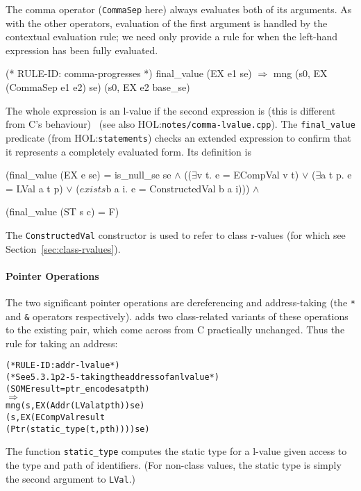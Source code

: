 \documentclass[11pt]{article}
\newcommand{\HOLfile}[1]{HOL:\texttt{#1}}
\begin{document}
\medskip
\noindent
{}%
The comma operator (\texttt{CommaSep} here) always evaluates both of
its arguments.  As with the other operators, evaluation of the first
argument is handled by the contextual evaluation rule; we need only
provide a rule for when the left-hand expression has been fully
evaluated.
\begin{stdrule}
(* RULE-ID: comma-progresses *)
     final_value (EX e1 se)
   \(\Rightarrow\)
     mng (s0, EX (CommaSep e1 e2) se)
         (s0, EX e2 base_se)
\end{stdrule}
%
The whole expression is an l-value if the second expression is (this
is different from C's behaviour)~\cite[\S5.18]{cpp-standard-iso14882}
(see also \HOLfile{notes/comma-lvalue.cpp}).
%
The \texttt{final_value} predicate (from \HOLfile{statements}) checks
an extended expression to confirm that it represents a completely
evaluated form.  Its definition is
\vspace{1ex}
\begin{stdrule}
   (final_value (EX e se) =
      is_null_se se \(\land\)
      ((\(\exists\)v t. e = ECompVal v t) \(\lor\)
       (\(\exists\)a t p. e = LVal a t p) \(\lor\)
       (\(exists\)b a i. e = ConstructedVal b a i))) \(\land\)

   (final_value (ST s c) = F)
\end{stdrule}
The \texttt{ConstructedVal} constructor %
%
is used to refer to class r-values (for which see
Section~\ref{sec:class-rvalues}).

\paragraph{Pointer Operations}
The two significant pointer operations are dereferencing and
address-taking (the \texttt{*} and \texttt{\&} operators
respectively).  \cpp{} adds two class-related variants of these
operations to the existing pair, which come across from C practically
unchanged.  Thus the rule for taking an address:
%
\begin{alltt}
(* RULE-ID: addr-lvalue *)
(* See 5.3.1 p2-5 - taking the address of an lvalue *)
     (SOME result = ptr_encode s a t pth)
   \(\Rightarrow\)
     mng (s, EX (Addr (LVal a t pth)) se)
         (s, EX (ECompVal result
                          (Ptr (static_type (t,pth)))) se)

\end{alltt}
%
The function
\texttt{static_type} computes
the static type for a l-value given access to the type and path of
identifiers.  (For non-class values, the static type is simply the
second argument to \texttt{LVal}.)
\end{document}
